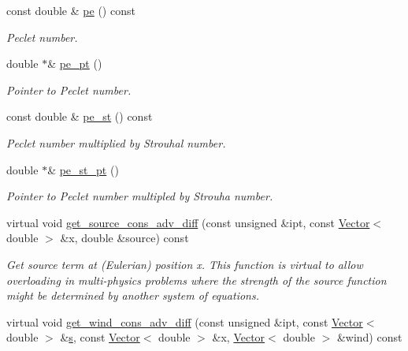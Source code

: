 \begin{DoxyCompactItemize}
const double \& \hyperlink{classoomph_1_1GeneralisedAdvectionDiffusionEquations_a690a83d5a63684541aac450255eed7e1}{pe} () const
\begin{DoxyCompactList}\small\item\em Peclet number. \end{DoxyCompactList}\item 
double $\ast$\& \hyperlink{classoomph_1_1GeneralisedAdvectionDiffusionEquations_a50b5c90517d71102ffe743f126993081}{pe\+\_\+pt} ()
\begin{DoxyCompactList}\small\item\em Pointer to Peclet number. \end{DoxyCompactList}\item 
const double \& \hyperlink{classoomph_1_1GeneralisedAdvectionDiffusionEquations_a9ba19e458e9afa3774437709951aada9}{pe\+\_\+st} () const
\begin{DoxyCompactList}\small\item\em Peclet number multiplied by Strouhal number. \end{DoxyCompactList}\item 
double $\ast$\& \hyperlink{classoomph_1_1GeneralisedAdvectionDiffusionEquations_ad380b81d292da4bfe1f9c7995dce7318}{pe\+\_\+st\+\_\+pt} ()
\begin{DoxyCompactList}\small\item\em Pointer to Peclet number multipled by Strouha number. \end{DoxyCompactList}\item 
virtual void \hyperlink{classoomph_1_1GeneralisedAdvectionDiffusionEquations_a33989015fe6f130fc51cc845b6367c39}{get\+\_\+source\+\_\+cons\+\_\+adv\+\_\+diff} (const unsigned \&ipt, const \hyperlink{classoomph_1_1Vector}{Vector}$<$ double $>$ \&x, double \&source) const
\begin{DoxyCompactList}\small\item\em Get source term at (Eulerian) position x. This function is virtual to allow overloading in multi-\/physics problems where the strength of the source function might be determined by another system of equations. \end{DoxyCompactList}\item 
virtual void \hyperlink{classoomph_1_1GeneralisedAdvectionDiffusionEquations_a1be1bf36e263379cf99eb1ee703d4337}{get\+\_\+wind\+\_\+cons\+\_\+adv\+\_\+diff} (const unsigned \&ipt, const \hyperlink{classoomph_1_1Vector}{Vector}$<$ double $>$ \&\hyperlink{cfortran_8h_ab7123126e4885ef647dd9c6e3807a21c}{s}, const \hyperlink{classoomph_1_1Vector}{Vector}$<$ double $>$ \&x, \hyperlink{classoomph_1_1Vector}{Vector}$<$ double $>$ \&wind) const

\end{DoxyCompactItemize}
